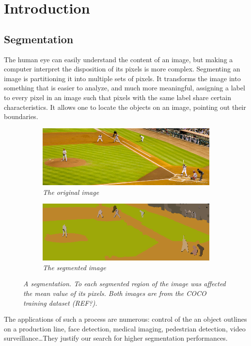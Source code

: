 \documentclass{article}
\begin{document}
\newpage
\section{Introduction}

    \subsection{Segmentation}
            The human eye can easily understand the content of an image, but making a computer interpret the disposition of its pixels is more complex. Segmenting an image is partitioning it into multiple sets of pixels. It transforms the image into something that is easier to analyze, and much more meaningful, assigning a label to every pixel in an image such that pixels with the same label share certain characteristics. It allows one to locate the objects on an image, pointing out their boundaries.

            \begin{figure}[!ht]
            \centering
            \begin{subfigure}{.49\linewidth}
                \centering
                \includegraphics[width=0.9\linewidth]{pics/img_segm1.jpg}
                \caption{\textit{The original image}}
            \end{subfigure}
            \begin{subfigure}{.49\linewidth}
                \centering
                \includegraphics[width=0.9\linewidth]{pics/img_segm2.png}
                \caption{\textit{The segmented image}}
            \end{subfigure}
                \caption{\textit{A segmentation. To each segmented region of the image was affected the mean value of its pixels. Both images are from the COCO training dataset (REF?).}}
                \label{fig:segm}
            \end{figure}
            The applications of such a process are numerous: control of the an object outlines on a production line, face detection, medical imaging, pedestrian detection, video surveillance\ldots They justify our search for higher segmentation performances.
\end{document}
